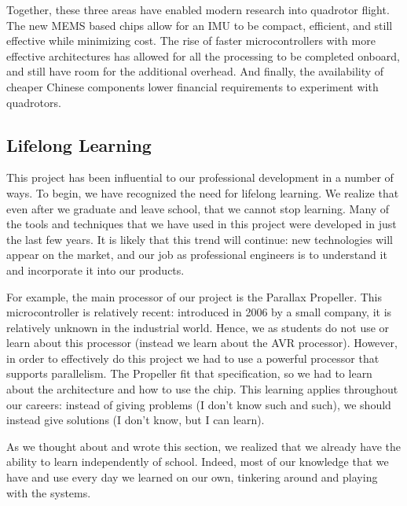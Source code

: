 \documentclass{article}
\numberwithin{equation}{section} %
\begin{document}
Together, these three areas have enabled modern research into quadrotor flight. The new MEMS based chips allow for an IMU to be compact, efficient, and still effective while minimizing cost. The rise of faster microcontrollers with more effective architectures has allowed for all the processing to be completed onboard, and still have room for the additional overhead. And finally, the availability of cheaper Chinese components lower financial requirements to experiment with quadrotors.


\subsection{Lifelong Learning}
This project has been influential to our professional development in a number of ways. To begin, we have recognized the need for lifelong learning. We realize that even after we graduate and leave school, that we cannot stop learning. Many of the tools and techniques that we have used in this project were developed in just the last few years. It is likely that this trend will continue: new technologies will appear on the market, and our job as professional engineers is to understand it and incorporate it into our products.

For example, the main processor of our project is the Parallax Propeller. This microcontroller is relatively recent: introduced in 2006 by a small company, it is relatively unknown in the industrial world. Hence, we as students do not use or learn about this processor (instead we learn about the AVR processor). However, in order to effectively do this project we had to use a powerful processor that supports parallelism. The Propeller fit that specification, so we had to learn about the architecture and how to use the chip. This learning applies throughout our careers: instead of giving problems (I don't know such and such), we should instead give solutions (I don't know, but I can learn).

As we thought about and wrote this section, we realized that we already have the ability to learn independently of school. Indeed, most of our knowledge that we have and use every day we learned on our own, tinkering around and playing with the systems.

\end{document}
